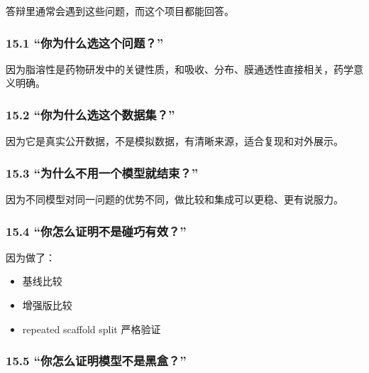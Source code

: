 \documentclass[
  ,
]{ctexart}
\providecommand{\tightlist}{%
  \setlength{\itemsep}{0pt}\setlength{\parskip}{0pt}}
\begin{document}
答辩里通常会遇到这些问题，而这个项目都能回答。

\hypertarget{ux4f60ux4e3aux4ec0ux4e48ux9009ux8fd9ux4e2aux95eeux9898}{%
\subsubsection{15.1
``你为什么选这个问题？''}\label{ux4f60ux4e3aux4ec0ux4e48ux9009ux8fd9ux4e2aux95eeux9898}}

因为脂溶性是药物研发中的关键性质，和吸收、分布、膜通透性直接相关，药学意义明确。

\hypertarget{ux4f60ux4e3aux4ec0ux4e48ux9009ux8fd9ux4e2aux6570ux636eux96c6}{%
\subsubsection{15.2
``你为什么选这个数据集？''}\label{ux4f60ux4e3aux4ec0ux4e48ux9009ux8fd9ux4e2aux6570ux636eux96c6}}

因为它是真实公开数据，不是模拟数据，有清晰来源，适合复现和对外展示。

\hypertarget{ux4e3aux4ec0ux4e48ux4e0dux7528ux4e00ux4e2aux6a21ux578bux5c31ux7ed3ux675f}{%
\subsubsection{15.3
``为什么不用一个模型就结束？''}\label{ux4e3aux4ec0ux4e48ux4e0dux7528ux4e00ux4e2aux6a21ux578bux5c31ux7ed3ux675f}}

因为不同模型对同一问题的优势不同，做比较和集成可以更稳、更有说服力。

\hypertarget{ux4f60ux600eux4e48ux8bc1ux660eux4e0dux662fux78b0ux5de7ux6709ux6548}{%
\subsubsection{15.4
``你怎么证明不是碰巧有效？''}\label{ux4f60ux600eux4e48ux8bc1ux660eux4e0dux662fux78b0ux5de7ux6709ux6548}}

因为做了：

\begin{itemize}
\tightlist
\item
  基线比较
\item
  增强版比较
\item
  repeated scaffold split 严格验证
\end{itemize}

\hypertarget{ux4f60ux600eux4e48ux8bc1ux660eux6a21ux578bux4e0dux662fux9ed1ux76d2}{%
\subsubsection{15.5
``你怎么证明模型不是黑盒？''}\label{ux4f60ux600eux4e48ux8bc1ux660eux6a21ux578bux4e0dux662fux9ed1ux76d2}}
\end{document}
